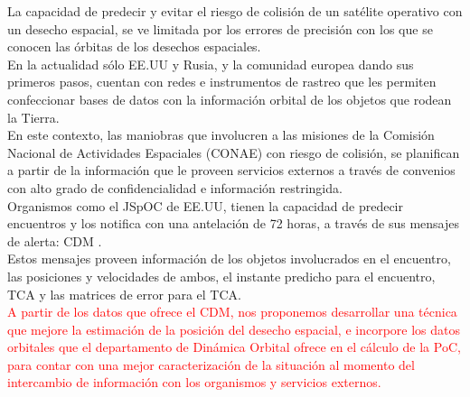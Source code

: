 La capacidad de predecir y evitar el riesgo de colisión de un sat\'elite operativo con un desecho espacial, se ve limitada por los errores de precisi\'on con los que se conocen las \'orbitas de los desechos espaciales.\\

En la actualidad s\'olo EE.UU y Rusia, y la comunidad europea dando sus primeros pasos, cuentan con redes e instrumentos de rastreo que les permiten confeccionar bases de datos con la informaci\'on orbital de los objetos que rodean la Tierra.\\

En este contexto, las maniobras que involucren a las misiones de la Comisi\'on Nacional de Actividades Espaciales (CONAE) con riesgo de colisi\'on, se planifican a partir de la informaci\'on que le proveen servicios externos a trav\'es de convenios con alto grado de confidencialidad e informaci\'on restringida.\\ 

Organismos como el \ac{JSpOC} de EE.UU, tienen la capacidad de predecir encuentros y los notifica con una antelaci\'on de 72 horas, a trav\'es de sus mensajes de alerta: \ac{CDM} \cite{CDM}.\\
Estos mensajes proveen informaci\'on de los objetos involucrados en el encuentro, las posiciones y velocidades de ambos, el instante predicho para el encuentro, \ac{TCA} y las matrices de error para el TCA.\\

\textcolor{red}{A partir de los datos que ofrece el \ac{CDM}, nos proponemos desarrollar una t\'ecnica que mejore la estimaci\'on de la posici\'on del desecho espacial, e incorpore los datos orbitales que el departamento de Din\'amica Orbital ofrece en el c\'alculo de la \ac{PoC}, para contar con una mejor caracterizaci\'on de la situaci\'on al momento del intercambio de informaci\'on con los organismos y servicios externos.}\\
